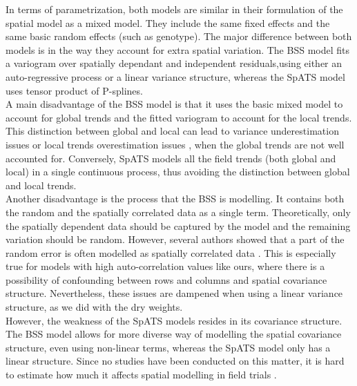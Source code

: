 In terms of parametrization, both models are similar in their formulation of the spatial model as a mixed model. They include the same fixed effects and the same basic random effects (such as genotype). The major difference between both models is in the way they account for extra spatial variation. The BSS model fits a variogram over spatially dependant and independent residuals,using either an auto-regressive process or a linear variance structure, whereas the SpATS model uses tensor product of P-splines.\\

A main disadvantage of the BSS model is that it uses the basic mixed model to account for global trends and the fitted variogram to account for the local trends. This distinction between global and local can lead to variance underestimation issues \parencite{zimmerman_random_1991} or local trends overestimation issues \parencite{gumpertz1991raleigh}, when the global trends are not well accounted for. Conversely, SpATS models all the field trends (both global and local) in a single continuous process, thus avoiding the distinction between global and local trends.\\

Another disadvantage is the process that the BSS is modelling. It contains both the random and the spatially correlated data as a single term. Theoretically, only the spatially dependent data should be captured by the model and the remaining variation should be random. However, several authors showed that a part of the random error is often modelled as spatially correlated data \parencite{cullis_spatial_1998,piepho_problems_2015}. This is especially true for models with high auto-correlation values like ours, where there is a possibility of confounding between rows and columns and spatial covariance structure. Nevertheless, these issues are dampened when using a linear variance structure, as we did with the dry weights.\\

However, the weakness of the SpATS models resides in its covariance structure. The BSS model allows for more diverse way of modelling the spatial covariance structure, even using non-linear terms, whereas the SpATS model only has a linear structure. Since no studies have been conducted on this matter, it is hard to estimate how much it affects spatial modelling in field trials \parencite{velazco_modelling_2017}.
 